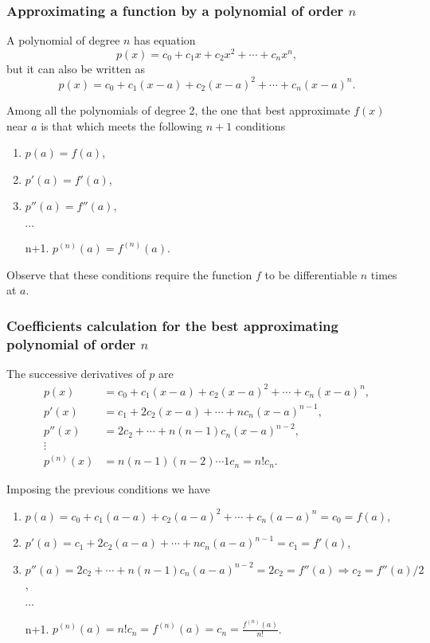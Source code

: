 \begin{frame}
\frametitle{Approximating a function by a polynomial of order $n$}
A polynomial of degree $n$ has equation
\[
p(x) = c_0+c_1x+c_2x^2+\cdots +c_nx^n,
\]
but it can also be written as
\[
p(x) = c_0+c_1(x-a)+c_2(x-a)^2+\cdots +c_n(x-a)^n.
\]

Among all the polynomials of degree 2, the one that best approximate $f(x)$ near $a$ is that which meets the following $n+1$ conditions
\begin{enumerate}
\item $p(a) = f(a)$,
\item $p'(a) = f'(a)$,
\item $p''(a)=f''(a)$,
\item[] $\cdots$
\item[n+1.] $p^{(n)}(a)=f^{(n)}(a)$.
\end{enumerate}

\alert{Observe that these conditions require the function $f$ to be differentiable $n$ times at $a$.}
\end{frame}


\begin{frame}
\frametitle{Coefficients calculation for the best approximating polynomial of order $n$}
The successive derivatives of $p$ are 
\begin{align*}
p(x) &= c_0+c_1(x-a)+c_2(x-a)^2+\cdots +c_n(x-a)^n,\\
p'(x)& = c_1+2c_2(x-a)+\cdots +nc_n(x-a)^{n-1},\\
p''(x)& = 2c_2+\cdots +n(n-1)c_n(x-a)^{n-2},\\
\vdots\ \
\\
p^{(n)}(x)&= n(n-1)(n-2)\cdots 1 c_n=n!c_n.
\end{align*}

Imposing the previous conditions we have
\begin{enumerate}
\item $p(a) = c_0+c_1(a-a)+c_2(a-a)^2+\cdots +c_n(a-a)^n=c_0=f(a)$,
\item $p'(a) = c_1+2c_2(a-a)+\cdots +nc_n(a-a)^{n-1}=c_1=f'(a)$,
\item $p''(a) = 2c_2+\cdots +n(n-1)c_n(a-a)^{n-2}=2c_2=f''(a)\Rightarrow c_2=f''(a)/2$,
\item[] $\cdots$
\item[n+1.] $p^{(n)}(a)=n!c_n=f^{(n)}(a)=c_n=\frac{f^{(n)}(a)}{n!}$.
\end{enumerate}
\end{frame}


